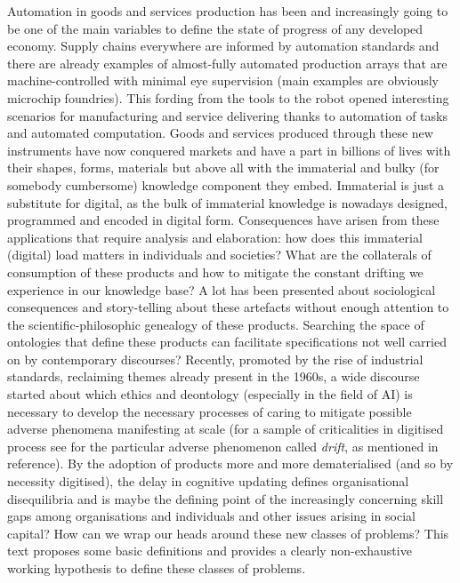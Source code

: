 \documentclass[14pt,a4paper]{extarticle}
\begin{document}
\hspace*{15mm}Automation in goods and services production has been and increasingly going to be one of the main variables to define the state of progress of any developed economy. Supply chains everywhere are informed by automation standards and there are already examples of almost-fully automated production arrays that are machine-controlled with minimal eye supervision (main examples are obviously microchip foundries). This fording from the tools to the robot opened interesting scenarios for manufacturing and service delivering thanks to automation of tasks and automated computation.
\newline
\hspace*{15mm}Goods and services produced through these new instruments have now conquered markets and have a part in billions of lives with their shapes, forms, materials but above all with the immaterial and bulky (for somebody cumbersome) knowledge component they embed. Immaterial is just a substitute for digital, as the bulk of immaterial knowledge is nowadays designed, programmed and encoded in digital form. Consequences have arisen from these applications that require analysis and elaboration: how does this immaterial (digital) load matters in individuals and societies? What are the collaterals of consumption of these products and how to mitigate the constant drifting we experience in our knowledge base? A lot has been presented about sociological consequences and story-telling about these artefacts \cite{UMPLEBYcybUSA} without enough attention to the scientific-philosophic genealogy of these products. Searching the space of ontologies that define these products can facilitate specifications not well carried on by contemporary discourses?
\newline
\hspace*{15mm}Recently, promoted by the rise of industrial standards, reclaiming themes already present in the 1960s, a wide discourse started about which ethics and deontology (especially in the field of AI) is necessary to develop the necessary processes of caring to mitigate possible adverse phenomena manifesting at scale (for a sample of criticalities in digitised process see \cite{Pentland2020} for the particular adverse phenomenon called \textit{drift}, as mentioned in reference). By the adoption of products more and more dematerialised (and so by necessity digitised), the delay in cognitive updating defines organisational disequilibria and is maybe the defining point of the increasingly concerning skill gaps among organisations and individuals and other issues arising in social capital? How can we wrap our heads around these new classes of problems? This text proposes some basic definitions and provides a clearly non-exhaustive working hypothesis to define these classes of problems. 
\end{document}
